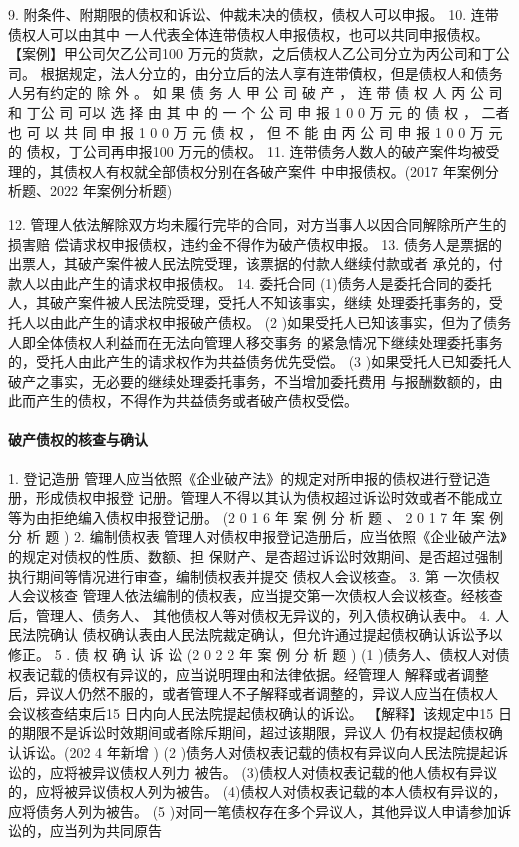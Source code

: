 \documentclass[UTF8,12pt]{ctexart}
\numberwithin{equation}{section} %
\numberwithin{figure}{section}
\numberwithin{table}{section}
\begin{document}
	9. 附条件、附期限的债权和诉讼、仲裁未决的债权，债权人可以申报。
	10. 连带债权人可以由其中 一人代表全体连带债权人申报债权，也可以共同申报债权。
	【案例】甲公司欠乙公司100 万元的货款，之后债权人乙公司分立为丙公司和丁公司。 根据规定，法人分立的，由分立后的法人享有连带債权，但是债权人和债务人另有约定的 除 外 。 如 果 债 务 人 甲 公 司 破 产 ， 连 带 债 权 人 丙 公 司 和 丁公 司 可以 选 择 由 其 中 的 一 个 公 司 申 报 1 0 0 万 元 的 债 权 ， 二者 也 可 以 共 同 申 报 1 0 0 万 元 债 权 ， 但 不 能 由 丙 公 司 申 报 1 0 0 万 元 的 债权，丁公司再申报100 万元的债权。
	11. 连带债务人数人的破产案件均被受理的，其债权人有权就全部债权分别在各破产案件 中申报债权。(2017 年案例分析题、2022 年案例分析题)
	
	12. 管理人依法解除双方均未履行完毕的合同，对方当事人以因合同解除所产生的损害赔 偿请求权申报债权，违约金不得作为破产债权申报。
	13. 债务人是票据的出票人，其破产案件被人民法院受理，该票据的付款人继续付款或者 承兑的，付款人以由此产生的请求权申报债权。
	14. 委托合同 (1)债务人是委托合同的委托人，其破产案件被人民法院受理，受托人不知该事实，继续 处理委托事务的，受托人以由此产生的请求权申报破产债权。
	(2 )如果受托人已知该事实，但为了债务人即全体债权人利益而在无法向管理人移交事务 的紧急情况下继续处理委托事务的，受托人由此产生的请求权作为共益债务优先受偿。
	(3 )如果受托人已知委托人破产之事实，无必要的继续处理委托事务，不当增加委托费用 与报酬数额的，由此而产生的债权，不得作为共益债务或者破产债权受偿。
	
	\paragraph{破产债权的核查与确认}
	1. 登记造册 管理人应当依照《企业破产法》的规定对所申报的债权进行登记造册，形成债权申报登 记册。管理人不得以其认为债权超过诉讼时效或者不能成立等为由拒绝编入债权申报登记册。 (2 0 1 6 年 案 例 分 析 题 、 2 0 1 7 年 案 例 分 析 题 )
	2. 编制债权表 管理人对债权申报登记造册后，应当依照《企业破产法》的规定对债权的性质、数额、担
	保财产、是杏超过诉讼时效期间、是否超过强制执行期间等情况进行审查，编制债权表并提交 债权人会议核查。
	3. 第 一次债权人会议核查 管理人依法编制的债权表，应当提交第一次债权人会议核查。经核查后，管理人、债务人、 其他债权人等对债权无异议的，列入债权确认表中。
	4. 人民法院确认 债权确认表由人民法院裁定确认，但允许通过提起债权确认诉讼予以修正。
	5 . 债 权 确 认 诉 讼 (2 0 2 2 年 案 例 分 析 题 )
	(1 )债务人、债权人对债权表记载的债权有异议的，应当说明理由和法律依据。经管理人 解释或者调整后，异议人仍然不服的，或者管理人不子解释或者调整的，异议人应当在债权人 会议核查结束后15 日内向人民法院提起债权确认的诉讼。
	【解释】该规定中15 日的期限不是诉讼时效期间或者除斥期间，超过该期限，异议人 仍有权提起债权确认诉讼。(202 4 年新增 )
	(2 )债务人对债权表记载的债权有异议向人民法院提起诉讼的，应将被异议债权人列力 被告。
	(3)债权人对债权表记载的他人债权有异议的，应将被异议债权人列为被告。 (4)债权人对债权表记载的本人债权有异议的，应将债务人列为被告。
	(5 )对同一笔债权存在多个异议人，其他异议人申请参加诉讼的，应当列为共同原告
	
\end{document}
